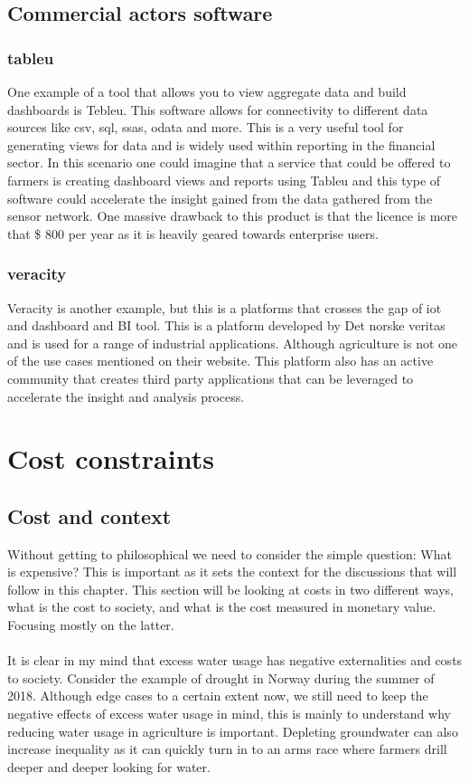 \documentclass[]{uiophd}
\begin{document}
\section{Commercial actors software}

\subsection{tableu}
One example of a tool that allows you to view aggregate data and build dashboards is Tebleu. This software allows for connectivity to different data sources like csv, sql, ssas, odata and more. This is a very useful tool for generating views for data and is widely used within reporting in the financial sector. In this scenario one could imagine that a service that could be offered to farmers is creating dashboard views and reports using Tableu and  this type of software could accelerate the insight gained from the data gathered from the sensor network. One massive drawback to this product is that the licence is more that \$ 800 per year as it is heavily geared towards enterprise users.\cite{tableu}

\subsection{veracity}
Veracity is another example, but this is a platforms that crosses the gap of iot and dashboard and BI tool. This is a platform developed by Det norske veritas and is used for a range of industrial applications. Although agriculture is not one of the use cases mentioned on their website. This platform also has an active community that creates third party applications that can be leveraged to accelerate the insight and analysis process. \cite{veracity}

\chapter{Cost constraints}

\section{Cost and context}
Without getting to philosophical we need to consider the simple question: What is expensive? This is important as it sets the context for the discussions that will follow in this chapter. This section will be looking at costs in two different ways, what is the cost to society, and what is the cost measured in monetary value. Focusing mostly on the latter. 
\\\\
It is clear in my mind that excess water usage has negative externalities and costs to society. Consider the  example of drought in Norway during the summer of 2018. Although edge cases to a certain extent now, we still need to keep the negative effects of excess water usage in mind, this is mainly to understand why reducing water usage in agriculture is important. Depleting groundwater can also increase inequality as it can quickly turn in to an arms race where farmers drill deeper and deeper looking for water.
\end{document}
